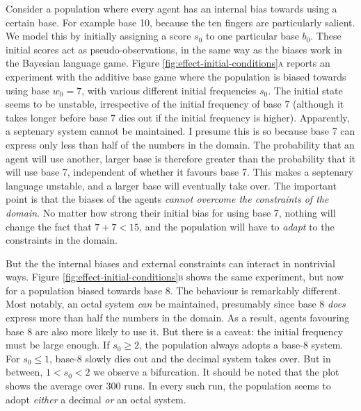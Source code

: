 \documentclass{../src/bcthesispart}
\begin{document}
Consider a population where every agent has an internal bias towards using a certain base. 
For example base 10, because the ten fingers are particularly salient. 
We model this by initially assigning a score $s_0$ to one particular base $b_0$.
These initial scores act as pseudo-observations, in the same way as the biases work in the Bayesian language game.
Figure \ref{fig:effect-initial-conditions}\textsc{a} reports an experiment with the additive base game where the population is biased towards using base $w_0 = 7$, with various different initial frequencies $s_0$.
The initial state seems to be unstable, irrespective of the initial frequency of base 7 (although it takes longer before base 7 dies out if the initial frequency is higher).
Apparently, a septenary system cannot be maintained. 
I presume this is so because base 7 can express only less than half of the numbers in the domain.
The probability that an agent will use another, larger base is therefore greater than the probability that it will use base 7, independent of whether it favours base 7.
This makes a septenary language unstable, and a larger base will eventually take over.
The important point is that the biases of the agents \emph{cannot overcome the  constraints of the domain}.
No matter how strong their initial bias for using base 7, nothing will change the fact that $7+7 < 15$, and the population will have to \emph{adapt} to the constraints in the domain.




But the the internal biases and external constraints can interact in nontrivial ways.
Figure \ref{fig:effect-initial-conditions}\textsc{b} shows the same experiment, but now for a population biased towards base 8.
The behaviour is remarkably different. 
Most notably, an octal system \emph{can} be maintained, presumably since base 8 \emph{does} express more than half the numbers in the domain.
As a result, agents favouring base 8 are also more likely to use it.
But there is a caveat: the initial frequency must be large enough. 
If $s_0 \ge 2$, the population always adopts a base-8 system.
For $s_0 \le 1$, base-8 slowly dies out and the decimal system takes over.
But in between, $1 <s_0 < 2$ we observe a bifurcation. 
It should be noted that the plot shows the average over 300 runs.
In every such run, the population seems to adopt \emph{either} a decimal \emph{or} an octal system.
\end{document}
